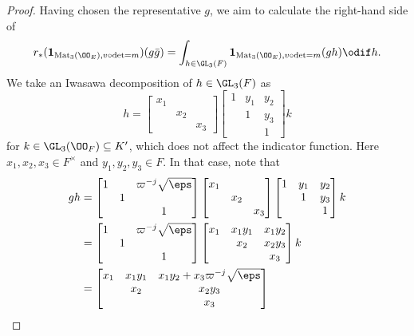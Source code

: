 \begin{proof}
  Having chosen the representative $g$, we aim to calculate the right-hand side of
  \[
    r_\ast(\mathbf{1}_{\Mat_3(\OO_E), v\circ\det=m})(g\bar{g})
    = \int_{h \in \GL_3(F)} \mathbf{1}_{\Mat_3(\OO_E), v\circ\det=m}(gh) \odif h.
  \]
  We take an Iwasawa decomposition of $h \in \GL_3(F)$ as
  \[
    h =
    \begin{bmatrix} x_1 \\ & x_2 \\ && x_3 \end{bmatrix}
    \begin{bmatrix} 1 & y_1 & y_2 \\ & 1 & y_3 \\ & & 1 \end{bmatrix}
    k
  \]
  for $k \in \GL_3(\OO_F) \subseteq K'$, which does not affect the indicator function.
  Here $x_1, x_2, x_3 \in F^\times$ and $y_1, y_2, y_3 \in F$.
  In that case, note that
  \begin{align*}
    gh
    &=
    \begin{bmatrix}
      1 &   & \varpi^{-j}\sqrt\eps \\
      & 1 \\
      &   & 1
    \end{bmatrix}
    \begin{bmatrix} x_1 \\ & x_2 \\ && x_3 \end{bmatrix}
    \begin{bmatrix} 1 & y_1 & y_2 \\ & 1 & y_3 \\ & & 1 \end{bmatrix} k \\
    &=
    \begin{bmatrix}
      1 &   & \varpi^{-j}\sqrt\eps \\
      & 1 \\
      &   & 1
    \end{bmatrix}
    \begin{bmatrix} x_1 & x_1 y_1 & x_1 y_2 \\ & x_2 & x_2 y_3 \\ & & x_3 \end{bmatrix} k \\
    &=
    \begin{bmatrix}
      x_1 & x_1 y_1 & x_1 y_2 + x_3 \varpi^{-j} \sqrt\eps \\
      & x_2 & x_2 y_3 \\
      & & x_3
    \end{bmatrix}

\end{align*}
\end{proof}
